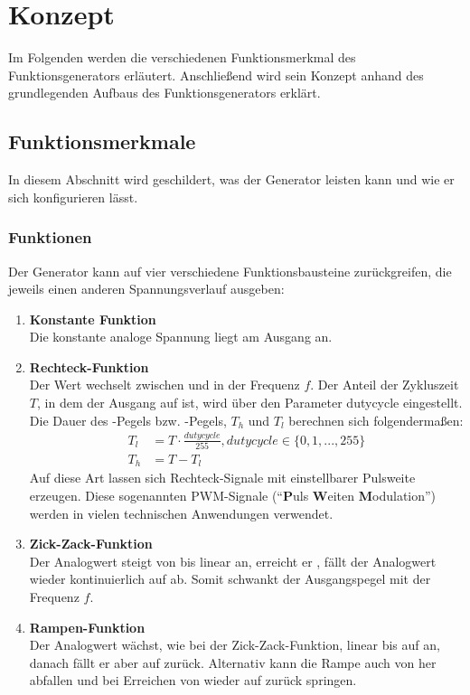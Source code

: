 \chapter{Konzept}
Im Folgenden werden die verschiedenen Funktionsmerkmal des Funktionsgenerators erläutert.
Anschließend wird sein Konzept anhand des grundlegenden Aufbaus des Funktionsgenerators erklärt.
 
\section{Funktionsmerkmale} \label{Concept:Feature}
In diesem Abschnitt wird geschildert, was der Generator leisten kann und wie er sich konfigurieren lässt. 

\subsection{Funktionen} \label{Concept:Feature:Func}
Der Generator kann auf vier verschiedene Funktionsbausteine zurückgreifen, die jeweils einen anderen Spannungsverlauf ausgeben:

\begin{enumerate}
   \item \textbf{Konstante Funktion} \\ 
    Die konstante analoge Spannung  liegt am Ausgang an.
  \item \textbf{Rechteck-Funktion} \\
    Der Wert wechselt zwischen  und  in der Frequenz $f$.
    Der Anteil der Zykluszeit $T$, in dem der Ausgang auf  ist, wird über den Parameter dutycycle eingestellt.
    Die Dauer des -Pegels bzw. -Pegels, $T_{h}$ und $T_{l}$ berechnen sich folgendermaßen:
    \begin{align}
      T_{l} &= T \cdot \frac{dutycycle}{255}, dutycycle \in \{0, 1, ..., 255\} \\
      T_{h} &= T - T_{l} 
    \end{align}
    Auf diese Art lassen sich Rechteck-Signale mit einstellbarer Pulsweite erzeugen.
    Diese sogenannten PWM-Signale (``\textbf{P}uls \textbf{W}eiten \textbf{M}odulation'') werden in vielen technischen Anwendungen verwendet.
  \item \textbf{Zick-Zack-Funktion} \\
    Der Analogwert steigt von  bis  linear an, erreicht er , fällt der Analogwert wieder kontinuierlich auf  ab. Somit schwankt der Ausgangspegel mit der Frequenz $f$.
  \item \textbf{Rampen-Funktion} \\
    Der Analogwert wächst, wie bei der Zick-Zack-Funktion, linear bis auf  an, danach fällt er aber auf  zurück.
    Alternativ kann die Rampe auch von  her abfallen und bei Erreichen von  wieder auf  zurück springen.
\end{enumerate}

